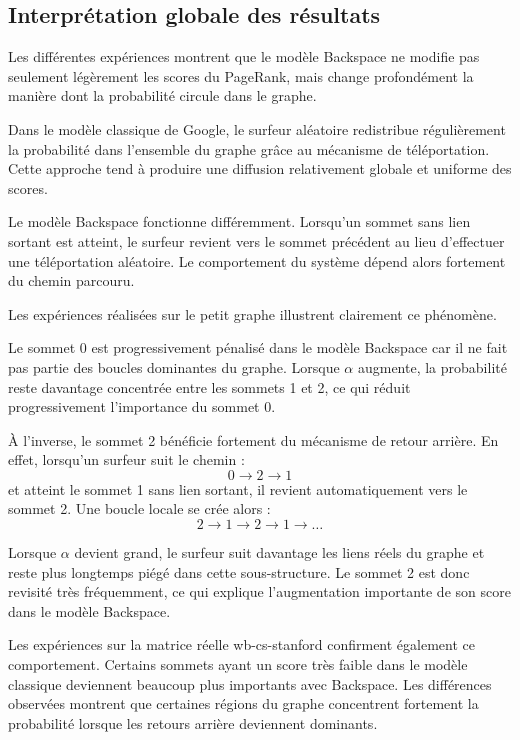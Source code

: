 \documentclass[a4paper,11pt]{article}
\begin{document}
\subsection{Interprétation globale des résultats}

Les différentes expériences montrent que le modèle Backspace ne modifie pas seulement légèrement les scores du PageRank, mais change profondément la manière dont la probabilité circule dans le graphe.

Dans le modèle classique de Google, le surfeur aléatoire redistribue régulièrement la probabilité dans l’ensemble du graphe grâce au mécanisme de téléportation. Cette approche tend à produire une diffusion relativement globale et uniforme des scores.

Le modèle Backspace fonctionne différemment. Lorsqu’un sommet sans lien sortant est atteint, le surfeur revient vers le sommet précédent au lieu d’effectuer une téléportation aléatoire. Le comportement du système dépend alors fortement du chemin parcouru.

Les expériences réalisées sur le petit graphe illustrent clairement ce phénomène.

Le sommet 0 est progressivement pénalisé dans le modèle Backspace car il ne fait pas partie des boucles dominantes du graphe. Lorsque $\alpha$ augmente, la probabilité reste davantage concentrée entre les sommets 1 et 2, ce qui réduit progressivement l’importance du sommet 0.

À l’inverse, le sommet 2 bénéficie fortement du mécanisme de retour arrière. En effet, lorsqu’un surfeur suit le chemin :
\[
0 \rightarrow 2 \rightarrow 1
\]
et atteint le sommet 1 sans lien sortant, il revient automatiquement vers le sommet 2. Une boucle locale se crée alors :
\[
2 \rightarrow 1 \rightarrow 2 \rightarrow 1 \rightarrow \dots
\]

Lorsque $\alpha$ devient grand, le surfeur suit davantage les liens réels du graphe et reste plus longtemps piégé dans cette sous-structure. Le sommet 2 est donc revisité très fréquemment, ce qui explique l’augmentation importante de son score dans le modèle Backspace.

Les expériences sur la matrice réelle wb-cs-stanford confirment également ce comportement. Certains sommets ayant un score très faible dans le modèle classique deviennent beaucoup plus importants avec Backspace. Les différences observées montrent que certaines régions du graphe concentrent fortement la probabilité lorsque les retours arrière deviennent dominants.
\end{document}
